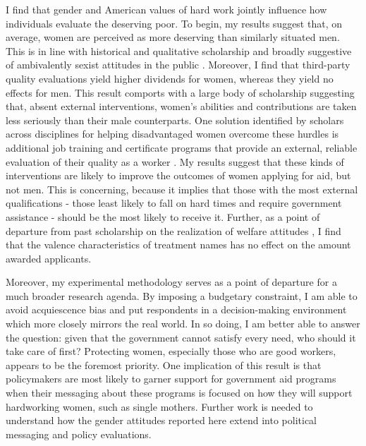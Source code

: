 \documentclass[12pt]{article}%
\begin{document}
\begin{doublespace}
I find that gender and American values of hard work jointly influence how individuals evaluate the deserving poor. To begin, my results suggest that, on average, women are perceived as more deserving than similarly situated men. This is in line with historical and qualitative scholarship \cite{willrich2000home} and broadly suggestive of ambivalently sexist attitudes in the public \citep{glick_ambivalent_2001, glick_hostile_1997}. Moreover, I find that third-party quality evaluations yield higher dividends for women, whereas they yield no effects for men. This result comports with a large body of scholarship suggesting that, absent external interventions, women's abilities and contributions are taken less seriously than their male counterparts. One solution identified by scholars across disciplines for helping disadvantaged women overcome these hurdles is additional job training and certificate programs that provide an external, reliable evaluation of their quality as a worker \citep{abel_value_2020, dadgar_labor_2015, jepsen_labor-market_2014}. My results suggest that these kinds of interventions are likely to improve the outcomes of women applying for aid, but not men. This is concerning, because it implies that those with the most external qualifications - those least likely to fall on hard times and require government assistance - should be the most likely to receive it. Further, as a point of departure from past scholarship on the realization of welfare attitudes \citep{hayes_2020}, I find that the valence characteristics of treatment names has no effect on the amount awarded applicants.

Moreover, my experimental methodology serves as a point of departure for a much broader research agenda. By imposing a budgetary constraint, I am able to avoid acquiescence bias and put respondents in a decision-making environment which more closely mirrors the real world. In so doing, I am better able to answer the question: given that the government cannot satisfy every need, who should it take care of first? Protecting women, especially those who are good workers, appears to be the foremost priority. One implication of this result is that policymakers are most likely to garner support for government aid programs when their messaging about these programs is focused on how they will support hardworking women, such as single mothers. Further work is needed to understand how the gender attitudes reported here extend into political messaging and policy evaluations.


\end{doublespace}
\end{document}
